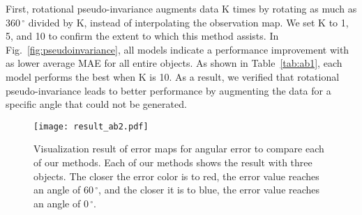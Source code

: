 First, rotational pseudo-invariance augments data K times by rotating as much as $360\,^{\circ}$ divided by K, instead of interpolating the observation map. We set K to 1, 5, and 10 to confirm the extent to which this method assists. In Fig.~\ref{fig:pseudoinvariance}, all models indicate a performance improvement with as lower average MAE for all entire objects. As shown in Table~\ref{tab:ab1}, each model performs the best when K is 10. As a result, we verified that rotational pseudo-invariance leads to better performance by augmenting the data for a specific angle that could not be generated.

\begin{figure}[t]
    \centering
    \texttt{[image: result\_ab2.pdf]}
    \caption{Visualization result of error maps for angular error to compare each of our methods. Each of our methods shows the result with three objects. The closer the error color is to red, the error value reaches an angle of $60\,^{\circ}$, and the closer it is to blue, the error value reaches an angle of $0\,^{\circ}$.}
    \label{fig:ab2result}
\end{figure}
\begin{table*}[!h]%
\caption{Results of our methods on the RGB event pair test dataset. The bold values are the best values in terms of performance. The w/o $O_{e}$ indicates that $O_{e}$ are not contained as input, while w $O_{e}$ indicates that $O_{e}$ are included as input.}
\label{tab:ab2}
\end{table*}
